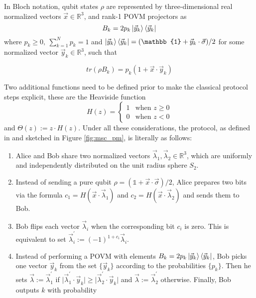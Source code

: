 In Bloch notation, qubit states $\rho$ are represented by three-dimensional real normalized vectors $\vec{x} \in \mathbb{R}^{3}$, and rank-1 POVM projectors as 
\begin{equation}\label{eq:rank1_povm}
B_{k} = 2p_{k}\ket{\vec{y}_{k}}\bra{\vec{y}_{k}}
\end{equation}
where $p_{k}\ge0,\ \sum_{k=1}^{N}p_{k}=1$ and $\ket{\vec{y}_{k}}\bra{\vec{y}_{k}} = (\mathbb{1} + \vec{y}_{k} \cdot \vec{\sigma})/2$ for some normalized vector $\vec{y}_{k} \in \mathbb{R}^{3}$, such that

\begin{equation}
tr(\rho B_{k}) = p_{k}(1 + \vec{x} \cdot \vec{y}_{k}) 
\end{equation}

Two additional functions need to be defined prior to make the classical protocol steps explicit, these are the Heaviside function
\begin{equation}
H(z) =
    \begin{cases}
      1 & \text{when $z \ge 0$}\\
      0 & \text{when $z<0$}
    \end{cases} 
\end{equation}
and $\Theta(z) := z \cdot H(z)$. Under all these considerations, the protocol, as defined in \cite{renner2022} and sketched in Figure \ref{fig:msc_pm}, is literally as follows:
\begin{enumerate}
 \item Alice and Bob share two normalized vectors $\vec{\lambda}_1, \vec{\lambda}_2 \in \mathbb{R}^{3}$, which are uniformly and independently distributed on the unit radius sphere $S_2$.
 \item Instead of sending a pure qubit $\rho = (\mathbb{1} + \vec{x} \cdot \vec{\sigma})/2$, Alice prepares two bits via the formula $c_1= H(\vec{x} \cdot \vec{\lambda}_1)$ and $c_2= H(\vec{x} \cdot \vec{\lambda}_2)$ and sends them to Bob.
 \item Bob flips each vector $\vec{\lambda}_i$ when the corresponding bit $c_i$ is zero. This is equivalent to set $\vec{\lambda}^{\prime}_{i} := (-1)^{1 + c_i} \vec{\lambda}_{i}$.
 \item Instead of performing a POVM with elements $B_{k} = 2p_{k}\ket{\vec{y}_{k}}\bra{\vec{y}_{k}}$, Bob picks one vector $\vec{y}_{k}$ from the set $\{\vec{y}_{k}\}$ according to the probabilities $\{p_{k}\}$. Then he sets $\vec{\lambda} := \vec{\lambda}^{\prime}_1$ if $\lvert \vec{\lambda}^{\prime}_1 \cdot \vec{y}_{k} \rvert \ge \lvert \vec{\lambda}^{\prime}_2 \cdot \vec{y}_{k} \rvert$ and $\vec{\lambda} := \vec{\lambda}^{\prime}_2$ otherwise. Finally, Bob outputs $k$ with probability
\end{enumerate}

